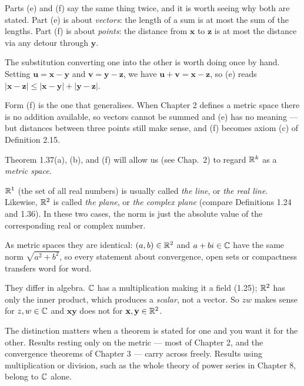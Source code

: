 \begin{unpack}
Parts (e) and (f) say the same thing twice, and it is worth seeing why both are
stated. Part (e) is about \emph{vectors}: the length of a sum is at most the sum
of the lengths. Part (f) is about \emph{points}: the distance from $\mathbf{x}$
to $\mathbf{z}$ is at most the distance via any detour through $\mathbf{y}$.

The substitution converting one into the other is worth doing once by hand.
Setting $\mathbf{u} = \mathbf{x}-\mathbf{y}$ and
$\mathbf{v} = \mathbf{y}-\mathbf{z}$, we have
$\mathbf{u}+\mathbf{v} = \mathbf{x}-\mathbf{z}$, so (e) reads
$|\mathbf{x}-\mathbf{z}| \le |\mathbf{x}-\mathbf{y}|+|\mathbf{y}-\mathbf{z}|$.

Form (f) is the one that generalises. When Chapter 2 defines a metric space
there is no addition available, so vectors cannot be summed and (e) has no
meaning --- but distances between three points still make sense, and (f) becomes
axiom (c) of Definition 2.15.
\end{unpack}

Theorem 1.37(a), (b), and (f) will allow us (see Chap.\ 2) to regard $\mathbb{R}^k$ as a
\emph{metric space}.

$\mathbb{R}^1$ (the set of all real numbers) is usually called \emph{the line}, or
\emph{the real line}. Likewise, $\mathbb{R}^2$ is called \emph{the plane}, or \emph{the
complex plane} (compare Definitions 1.24 and 1.36). In these two cases, the norm
is just the absolute value of the corresponding real or complex number.

\begin{pitfall}
As metric spaces they are identical: $(a,b) \in \mathbb{R}^2$ and $a+bi \in \mathbb{C}$ have the
same norm $\sqrt{a^2+b^2}$, so every statement about convergence, open sets or
compactness transfers word for word.

They differ in algebra. $\mathbb{C}$ has a multiplication making it a field (1.25);
$\mathbb{R}^2$ has only the inner product, which produces a \emph{scalar}, not a vector.
So $zw$ makes sense for $z,w \in \mathbb{C}$ and $\mathbf{x}\mathbf{y}$ does not for
$\mathbf{x},\mathbf{y} \in \mathbb{R}^2$.

The distinction matters when a theorem is stated for one and you want it for the
other. Results resting only on the metric --- most of Chapter 2, and the
convergence theorems of Chapter 3 --- carry across freely. Results using
multiplication or division, such as the whole theory of power series in Chapter
8, belong to $\mathbb{C}$ alone.
\end{pitfall}

